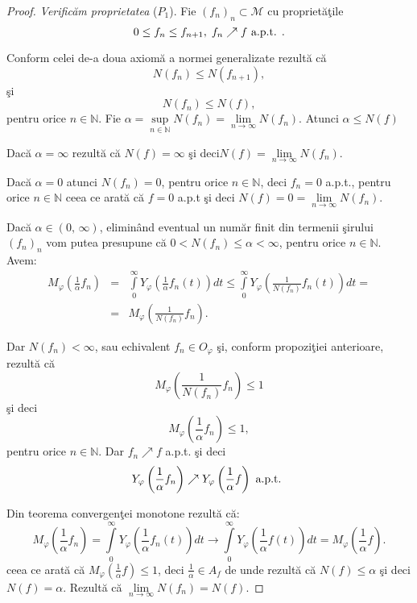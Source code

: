 \documentclass[ a4paper, 12pt]{report}
\theoremstyle{definition}
\theoremstyle{remark}
\numberwithin{equation}{section}
\begin{document}
\begin{proof} \emph{Verific\u am proprietatea} ($P_1$). Fie $(f_n)_n \subset \mathcal{M}$ cu propriet\u a\c tile
$$0 \leq f_n \leq f_{n+1}, \; f_n \nearrow f \hbox{ a.p.t. }.$$

Conform celei de-a doua axiom\u a a normei generalizate rezult\u a c\u  a
$$N(f_n) \leq N(f_{n+1}),$$ \c si
$$N(f_n) \leq N(f),$$  pentru orice $n \in \mathbb{N}$.
Fie $\alpha = \sup\limits_{n \in \mathbb{N}}N(f_n) = \lim\limits_{n \to \infty} N(f_n)$.
Atunci $ \alpha \leq N(f)$

Dac\u a $\alpha = \infty$ rezult\u a c\u a $N(f) = \infty$ \c si deci$N(f) = \lim\limits_{n \to \infty} N(f_n)$.

Dac\u a $\alpha = 0$ atunci $N(f_n) = 0$, pentru orice $n \in \mathbb{N}$, deci $f_n = 0$ a.p.t., pentru orice $n \in \mathbb{N}$ ceea ce arat\u a c\u  a  $f = 0$ a.p.t  \c si deci $N(f) = 0 = \lim\limits_{n \to \infty} N(f_n)$.

Dac\u a $\alpha \in (0, \, \infty)$, elimin\^ and eventual un num\u ar finit din termenii \c sirului $(f_n)_n$ vom putea presupune c\u  a $0 < N(f_n) \leq \alpha < \infty$, pentru orice $n \in \mathbb{N}$. Avem:
\begin{eqnarray*}
M_\varphi\left (\frac{1}{\alpha}f_n\right ) &=& \int\limits_{0}^{\infty} Y_\varphi\left(\frac{1}{\alpha} f_n(t)\right) dt \leq \int\limits_{0}^{\infty}Y_\varphi\left (\frac{1}{N(f_n)}f_n(t)\right ) dt = \\
&=& M_\varphi\left(\frac{1}{N(f_n)} f_n\right).
\end{eqnarray*}

Dar $N(f_n) < \infty$, sau echivalent $f_n \in O_\varphi$ \c si, conform propozi\c tiei anterioare, rezult\u a c\u a
$$M_\varphi\left (\frac{1}{N(f_n)}f_n\right ) \leq 1$$ \c si deci
$$ M_\varphi\left (\frac{1}{\alpha} f_n  \right ) \leq 1,$$ pentru orice $n \in \mathbb{N}$. Dar $f_n \nearrow f$ a.p.t.  \c si deci
$$Y_\varphi\left (\frac{1}{\alpha}f_n \right ) \nearrow Y_\varphi\left (\frac{1}{\alpha}f \right ) \hbox{ a.p.t. }$$

Din teorema convergen\c tei monotone rezult\u a c\u a:
$$M_\varphi\left (\frac{1}{\alpha}f_n\right ) = \int\limits_{0}^{\infty}Y_\varphi\left (\frac{1}{\alpha}f_n(t)\right ) dt \rightarrow \int\limits_{0}^{\infty} Y_\varphi(\frac{1}{\alpha}f(t)) dt = M_\varphi\left (\frac{1}{\alpha}f\right ).$$ ceea ce arat\u a c\u a
$M_\varphi(\frac{1}{\alpha}f)\leq 1 $, deci $\frac{1}{\alpha} \in A_f$ de unde rezult\u a c\u  a $N(f) \leq \alpha$ \c si deci $N(f) = \alpha$. Rezult\u a c\u a $\lim\limits_{n \rightarrow \infty} N(f_n) = N(f)$.


\end{proof}
\end{document}
